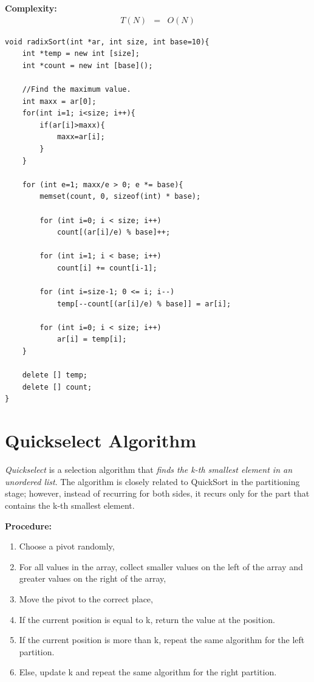 \documentclass[12pt]{article}
\begin{document}
\textbf{Complexity: }
\begin{eqnarray*}
	T(N) &=& O(N)
\end{eqnarray*}

\begin{verbatim}
void radixSort(int *ar, int size, int base=10){
    int *temp = new int [size];
    int *count = new int [base]();

    //Find the maximum value.
    int maxx = ar[0];
    for(int i=1; i<size; i++){
        if(ar[i]>maxx){
            maxx=ar[i];
        }
    }
	
    for (int e=1; maxx/e > 0; e *= base){
        memset(count, 0, sizeof(int) * base);
		
        for (int i=0; i < size; i++)
            count[(ar[i]/e) % base]++;
		
        for (int i=1; i < base; i++)
            count[i] += count[i-1];
		
        for (int i=size-1; 0 <= i; i--)
            temp[--count[(ar[i]/e) % base]] = ar[i];
		
        for (int i=0; i < size; i++)
            ar[i] = temp[i];
    }
	
    delete [] temp;
    delete [] count;
}
\end{verbatim}


\cleardoublepage
    \section{Quickselect Algorithm}
	
	\textit{Quickselect} is a selection algorithm that \textit{finds the k-th smallest element in an unordered list}. The algorithm is closely related to QuickSort in the partitioning stage; however, instead of recurring for both sides, it recurs only for the part that contains the k-th smallest element.

\textbf{Procedure: }
\begin{enumerate}
	\item Choose a pivot randomly,
	\item For all values in the array, collect smaller values on the left of the array and greater values on the right of the array,
	\item Move the pivot to the correct place,
	\item If the current position is equal to k, return the value at the position.
	\item If the current position is more than k, repeat the same algorithm for the left partition.
	\item Else, update k and repeat the same algorithm for the right partition.
\end{enumerate}	
\end{document}
